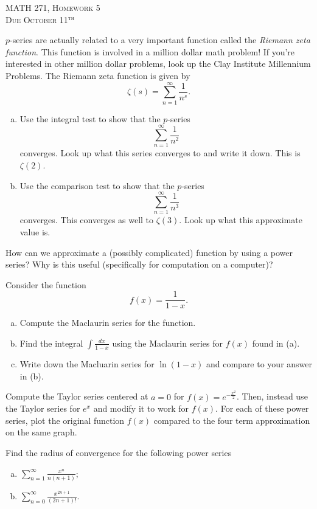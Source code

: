 \documentclass[12pt]{article} %
\begin{document}
\begin{center}
   \textsc{\large MATH 271, Homework 5}\\
   \textsc{Due October 11$^\textrm{th}$}
\end{center}
\vspace{.5cm}

\begin{problem} $p$-series are actually related to a very important function called the \emph{Riemann zeta function}.  This function is involved in a million dollar math problem! If you're interested in other million dollar problems, look up the Clay Institute Millennium Problems. The Riemann zeta function is given by
\[
\zeta (s) = \sum_{n=1}^\infty \frac{1}{n^s}.
\]
\begin{enumerate}[(a)]
    \item Use the integral test to show that the $p$-series
    \[
    \sum_{n=1}^\infty \frac{1}{n^2}
    \]
    converges.  Look up what this series converges to and write it down. This is $\zeta(2)$.
    \item Use the comparison test to show that the $p$-series
    \[
    \sum_{n=1}^\infty \frac{1}{n^3}
    \]
    converges. This converges as well to $\zeta(3)$. Look up what this approximate value is.
\end{enumerate}
\end{problem}

\begin{problem}
How can we approximate a (possibly complicated) function by using a power series? Why is this useful (specifically for computation on a computer)?
\end{problem}

\begin{problem} Consider the function
\[
f(x)=\frac{1}{1-x}.
\]
\begin{enumerate}[(a)]
    \item Compute the Maclaurin series for the function.
    \item Find the integral $\int \frac{dx}{1-x}$ using the Maclaurin series for $f(x)$ found in (a).  
    \item Write down the Macluarin series for $\ln(1-x)$ and compare to your answer in (b).
\end{enumerate}
\end{problem}

\begin{problem} 
Compute the Taylor series centered at $a=0$ for $f(x)=e^{-\frac{x^2}{2}}$. Then, instead use the Taylor series for $e^x$ and modify it to work for $f(x)$.  For each of these power series, plot the original function $f(x)$ compared to the four term approximation on the same graph.
\end{problem}

\begin{problem}
Find the radius of convergence for the following power series
\begin{enumerate}[(a)]
    \item $\displaystyle{\sum_{n=1}^\infty \frac{x^n}{n(n+1)}}$;
    \item $\displaystyle{\sum_{n=0}^\infty \frac{x^{2n+1}}{(2n+1)!}}$.
\end{enumerate}
\end{problem}
\end{document}

